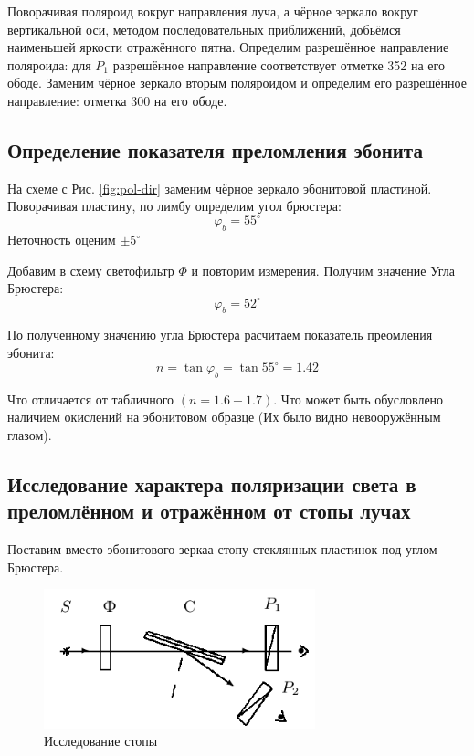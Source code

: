 \documentclass{article}
\begin{document}
Поворачивая поляроид вокруг направления луча, а чёрное зеркало вокруг вертикальной оси, методом последовательных приближений,
добьёмся наименьшей яркости отражённого пятна. Определим разрешённое направление поляроида: для \(P_1\) разрешённое
направление соответствует отметке 352 на его ободе. Заменим чёрное зеркало вторым поляроидом и определим его
разрешённое направление: отметка 300 на его ободе.

\subsection{Определение показателя преломления эбонита}

На схеме с Рис. \ref{fig:pol-dir} заменим чёрное зеркало эбонитовой пластиной. Поворачивая пластину, по лимбу определим
угол брюстера: 
\[ \varphi_b = 55^\circ \]
Неточность оценим \(\pm 5^\circ\)

Добавим в схему светофильтр \(\Phi\) и повторим измерения. Получим значение Угла Брюстера:
\[ \varphi_b = 52^\circ \]

По полученному значению угла Брюстера расчитаем показатель преомления эбонита:
\[ n = \tan{\varphi_b} = \tan{55^\circ} = 1.42 \]

Что отличается от табличного \(\left( n = 1.6 - 1.7 \right)\). Что может быть обусловлено наличием окислений
на эбонитовом образце (Их было видно невооружённым глазом).

\subsection{Исследование характера поляризации света в преломлённом и отражённом от стопы лучах}

Поставим вместо эбонитового зеркаа стопу стеклянных пластинок под углом Брюстера.

\begin{figure}[H]
    \centering
    \includegraphics[width=0.7\textwidth]{stack.png}
    \caption{Исследование стопы}
    \label{fig:stack}
\end{figure} 
\end{document}
